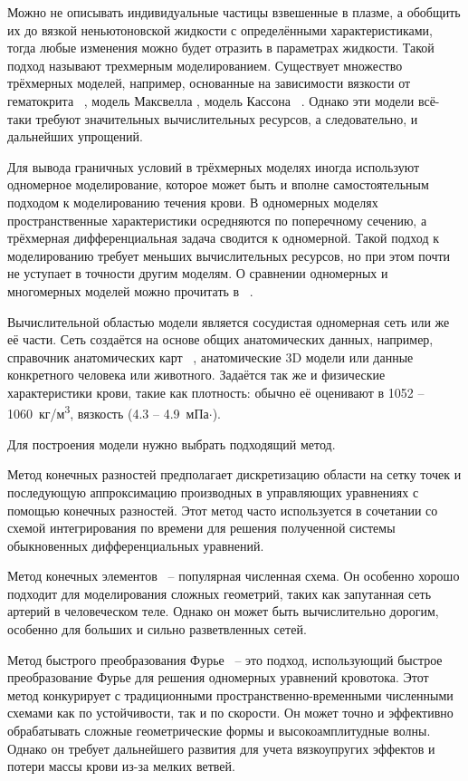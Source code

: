 Можно не описывать индивидуальные частицы взвешенные в плазме, а обобщить их до вязкой неньютоновской жидкости с определёнными 
характеристиками, тогда любые изменения можно будет отразить в параметрах жидкости. Такой подход называют трехмерным моделированием.
Существует множество трёхмерных моделей, например, основанные на зависимости вязкости от гематокрита ~\cite{walburn:1976},
модель Максвелла \cite{thurston:1972},  модель Кассона ~\cite{moller:2006}.
Однако эти модели всё-таки требуют значительных вычислительных ресурсов, а следовательно, и дальнейших упрощений. 

Для вывода граничных условий в трёхмерных моделях иногда используют одномерное моделирование, которое может быть 
и вполне самостоятельным подходом к моделированию течения крови.
В одномерных моделях пространственные характеристики осредняются по поперечному сечению, а трёхмерная дифференциальная
задача сводится к одномерной. Такой подход к моделированию требует меньших вычислительных ресурсов, но при этом почти не уступает в 
точности другим моделям. О сравнении одномерных и многомерных моделей можно прочитать в ~\cite{FORMAGGIA:2001}.

Вычислительной областью модели является сосудистая одномерная сеть или же её части. Сеть создаётся на основе общих анатомических данных,
например, справочник анатомических карт ~\cite{bunicheva:2013}, анатомические 3D модели или данные конкретного человека или животного. 
Задаётся так же и физические характеристики крови, такие как плотность: обычно её оценивают в 1052 -- 1060~кг/м\textsuperscript{3},
вязкость (4.3 -- 4.9~мПа$\cdot$). 



Для построения модели нужно выбрать подходящий метод.

Метод конечных разностей предполагает дискретизацию области на сетку точек и последующую аппроксимацию производных в управляющих
уравнениях с помощью конечных разностей. Этот метод часто используется в сочетании со схемой интегрирования по времени для решения 
полученной системы обыкновенных дифференциальных уравнений.

Метод конечных элементов~\cite{TAYLOR1998} -- популярная численная схема. 
Он особенно хорошо подходит для моделирования сложных геометрий, таких как запутанная сеть артерий в человеческом теле. 
Однако он может быть вычислительно дорогим, особенно для больших и сильно разветвленных сетей. 

Метод быстрого преобразования Фурье~\cite{Sazonov:2019} -- 
это подход, использующий быстрое преобразование Фурье для решения одномерных уравнений кровотока. 
Этот метод конкурирует с традиционными пространственно-временными численными схемами как по устойчивости, так и по скорости. 
Он может точно и эффективно обрабатывать сложные геометрические формы и высокоамплитудные волны. 
Однако он требует дальнейшего развития для учета вязкоупругих эффектов и потери массы крови из-за мелких ветвей. 

